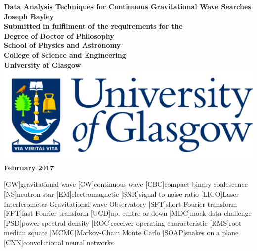 \documentclass[12pt,titlepage,oneside]{book}
\begin{document}
\begin{titlepage}
\centering
\vspace*{3cm}  %
\bfseries\Large
Data Analysis Techniques for Continuous Gravitational Wave Searches\\
\vspace{3cm}
\normalfont\large
Joseph Bayley\\
\vspace{2cm}
Submitted in fulfilment of the requirements for the\\
Degree of Doctor of Philosophy\\
\vspace{2cm}
School of Physics and Astronomy\\
College of Science and Engineering\\
University of Glasgow\\
\vspace{1cm}
\includegraphics[scale=0.125]{GlaLogo.pdf}
\\
\vspace{1cm}
February 2017
\end{titlepage}
\frontmatter  %

\tableofcontents
\listoftables
\listoffigures



[GW]{gravitational-wave}
[CW]{continuous wave}
[CBC]{compact binary coalescence}
[NS]{neutron star}
[EM]{electromagnetic}
[SNR]{signal-to-noise-ratio}
[LIGO]{Laser Interferometer Gravitational-wave Observatory}
[SFT]{short Fourier transform}
[FFT]{fast Fourier transform}
[UCD]{up, centre or down}
[MDC]{mock data challenge}
[PSD]{power spectral density}
[ROC]{receiver operating characteristic}
[RMS]{root median square}
[MCMC]{Markov-Chain Monte Carlo}
[SOAP]{snakes on a plane}
[CNN]{convolutional neural networks}

\mainmatter %










\appendix


\end{document}
